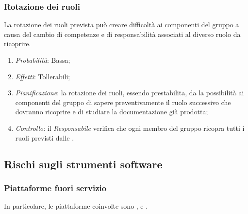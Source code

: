 		\subsubsection{Rotazione dei ruoli}

La rotazione dei ruoli prevista può creare difficoltà ai componenti del gruppo a causa del cambio di competenze e di responsabilità associati al diverso ruolo da ricoprire.

\begin{enumerate}
\item \textit{Probabilità}: Bassa;
\item \textit{Effetti}: Tollerabili;
\item \textit{Pianificazione}: la rotazione dei ruoli, essendo prestabilita, da la possibilità ai componenti del gruppo di sapere preventivamente il ruolo successivo che dovranno ricoprire e di studiare la documentazione già prodotta;
\item \textit{Controllo}: il \emph{Responsabile} verifica che ogni membro del gruppo ricopra tutti i ruoli previsti dalle \NormeDiProgetto .
\end{enumerate}
	
	\subsection{Rischi sugli strumenti software}
	
		\subsubsection{Piattaforme fuori servizio}	

In particolare, le piattaforme coinvolte sono ,  e . 

